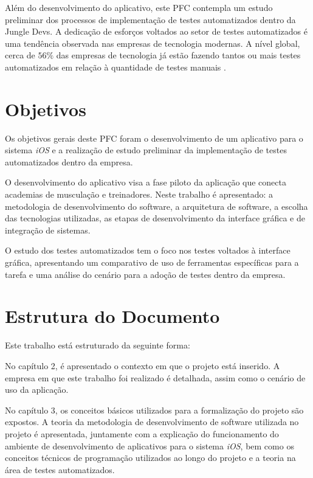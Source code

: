 Além do desenvolvimento do aplicativo, este PFC contempla um estudo preliminar dos processos de implementação de testes automatizados dentro da Jungle Devs. A dedicação de esforços voltados ao setor de testes automatizados é uma tendência observada nas empresas de tecnologia modernas. A nível global, cerca de $56\%$ das empresas de tecnologia já estão fazendo tantos ou mais testes automatizados em relação à quantidade de testes manuais . 

\section{Objetivos}
Os objetivos gerais deste PFC foram o desenvolvimento de um aplicativo para o sistema \textit{iOS} e a realização de estudo preliminar da implementação de testes automatizados dentro da empresa. 

O desenvolvimento do aplicativo visa a fase piloto da aplicação que conecta academias de musculação e treinadores. Neste trabalho é apresentado: a metodologia de desenvolvimento do software, a arquitetura de software, a escolha das tecnologias utilizadas, as etapas de desenvolvimento da interface gráfica e de integração de sistemas. 

O estudo dos testes automatizados tem o foco nos testes voltados à interface gráfica, apresentando um comparativo de uso de ferramentas específicas para a tarefa e uma análise do cenário para a adoção de testes dentro da empresa.

\section{Estrutura do Documento}
Este trabalho está estruturado da seguinte forma: 

No capítulo 2, é apresentado o contexto em que o projeto está inserido. A empresa em que este trabalho foi realizado é detalhada, assim como o cenário de uso da aplicação.

No capítulo 3, os conceitos básicos utilizados para a formalização do projeto são expostos. A teoria da metodologia de desenvolvimento de software utilizada no projeto é apresentada, juntamente com a explicação do funcionamento do ambiente de desenvolvimento de aplicativos para o sistema \textit{iOS}, bem como os conceitos técnicos de programação utilizados ao longo do projeto e a teoria na área de testes automatizados.

